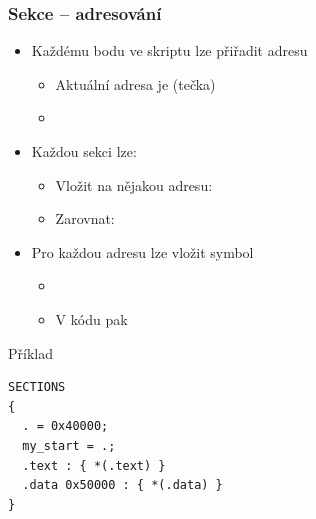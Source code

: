 \begin{frame}[fragile]
  \frametitle{Sekce -- adresování}

  \begin{itemize}
    \item Každému bodu ve skriptu lze přiřadit adresu
    \begin{itemize}
      \item Aktuální adresa je  (tečka)
      \item {}
    \end{itemize}

    \pause

    \item Každou sekci lze:
    \begin{itemize}
      \item Vložit na nějakou adresu: 
      \item Zarovnat: 
    \end{itemize}

    \pause

    \item Pro každou adresu lze vložit symbol
    \begin{itemize}
      \item {}
      \item V kódu pak 
    \end{itemize}
  \end{itemize}

  \pause

  \begin{block}{Příklad}
    \begin{lstlisting}[aboveskip=2pt,belowskip=2pt]
SECTIONS
{
  . = 0x40000;
  my_start = .;
  .text : { *(.text) }
  .data 0x50000 : { *(.data) }
}
  \end{lstlisting}
  \end{block}

\end{frame}

